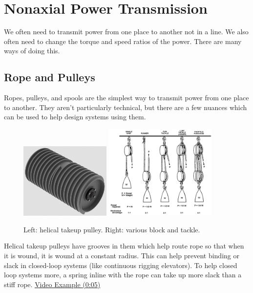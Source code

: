 \section{Nonaxial Power Transmission}

We often need to transmit power from one place to another not in a line. We also often need to change the torque and speed ratios of the power. There are many ways of doing this.

\subsection{Rope and Pulleys}
Ropes, pulleys, and spools are the simplest way to transmit power from one place to another. They aren't particularly technical, but there are a few nuances which can be used to help design systems using them.

\begin{figure}[H]	
	\includegraphics[width=0.4\textwidth]{imgs/takeup_pulley.png}
	\includegraphics[width=0.5\textwidth]{imgs/block_tackle.png}
	\caption{Left: helical takeup pulley. Right: various block and tackle.}
\end{figure}

Helical takeup pulleys have grooves in them which help route rope so that when it is wound, it is wound at a constant radius. This can help prevent binding or slack in closed-loop systems (like continuous rigging elevators). To help closed loop systems more, a spring inline with the rope can take up more slack than a stiff rope. \href{https://youtu.be/kyfb8lGAveY?t=5}{\color{red}\underline{Video Example (0:05)}}

